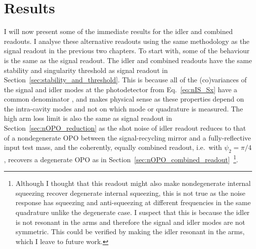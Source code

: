 \section{Results}
\label{sec:idlerRO_initial_results}

I will now present some of the immediate results for the idler and combined readouts. %
I analyse these alternative readouts using the same methodology as the signal readout in the previous two chapters. 
To start with, some of the behaviour is the same as the signal readout. 
The idler and combined readouts have the same stability and singularity threshold as signal readout in Section~\ref{sec:stability_and_threshold}. This is because all of the (co)variances of the signal and idler modes at the photodetector from Eq.~\ref{eq:nIS_Sx} have a common denominator , and makes physical sense as these properties depend on the intra-cavity modes and not on which mode or quadrature is measured.  
The high arm loss limit is also the same as signal readout in Section~\ref{sec:nOPO_reduction} as the shot noise of idler readout reduces to that of a nondegenerate OPO between the signal-recycling mirror and a fully-reflective input test mass, and the coherently, equally combined readout, i.e.\ with $\psi_2=\pi/4$, recovers a degenerate OPO  as in Section~\ref{sec:nOPO_combined_readout}~\footnote{Although I thought that this readout might also make nondegenerate internal squeezing recover degenerate internal squeezing, this is not true as the noise response has squeezing and anti-squeezing at different frequencies in the same quadrature unlike the degenerate case. I suspect that this is because the idler is not resonant in the arms and therefore the signal and idler modes are not symmetric. This could be verified by making the idler resonant in the arms, which I leave to future work.}.
